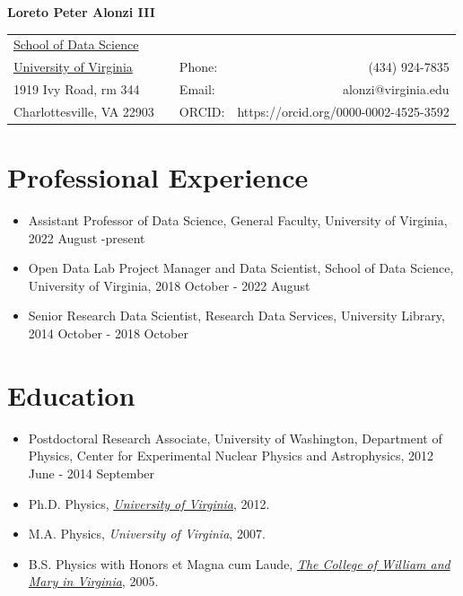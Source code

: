 \documentclass[10pt]{article}
\begin{document}
\begin{center}
{\LARGE \textbf{Loreto Peter Alonzi III} }

\vspace{0.5cm}

\begin{tabular}{lclr}
\hline
\hline
\href{https://datascience.virginia.edu/}{School of Data Science} & \qquad \qquad & & \\
\href{https://www.virginia.edu}{University of Virginia} & \qquad \qquad &Phone: & (434) 924-7835 \\
1919 Ivy Road, rm 344 & \qquad \qquad & Email: & alonzi@virginia.edu \\
Charlottesville, VA 22903& \qquad \qquad & ORCID: & https://orcid.org/0000-0002-4525-3592 \\
\hline
\hline
\end{tabular}
\end{center}

\section*{Professional Experience}
\begin{itemize}
\item Assistant Professor of Data Science, General Faculty, University of Virginia, 2022 August -present
\item Open Data Lab Project Manager and Data Scientist, School of Data Science, University of Virginia, 2018 October - 2022 August
\item Senior Research Data Scientist, Research Data Services, University Library, 2014 October - 2018 October
\end{itemize}

\section*{Education}
\begin{itemize}
\item Postdoctoral Research Associate, University of Washington, Department of Physics, Center for Experimental Nuclear Physics and Astrophysics, 2012 June - 2014 September
\item Ph.D. Physics, \href{http://www.phys.virginia.edu/}{\emph{University of Virginia}}, 2012.
\item M.A. Physics, \emph{University of Virginia}, 2007.
\item B.S. Physics with Honors et Magna cum Laude, \href{http://www.wm.edu/}{\emph{The College of William and Mary in Virginia}}, 2005.
\end{itemize}
\end{document}

